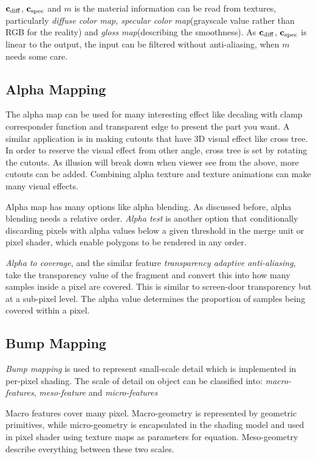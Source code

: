 \documentclass[10pt, a4paper]{article}
\begin{document}
$\textbf{c}_{\rm{diff}}$, $\textbf{c}_{\rm{spec}}$ and $m$ is the material information can be read from textures, particularly \emph{diffuse color map, specular color map}(grayscale value rather than RGB for the reality) and \emph{gloss map}(describing the smoothness). As $\textbf{c}_{\rm{diff}}$, $\textbf{c}_{\rm{spec}}$ is linear to the output, the input can be filtered without anti-aliasing, when $m$ needs some care. 
\subsection{Alpha Mapping}
The alpha map can be used for many interesting effect like decaling with clamp corresponder function and transparent edge to present the part you want. A similar application is in making cutouts that have 3D visual effect like cross tree. In order to reserve the visual effect from other angle, cross tree is set by rotating the cutouts. As illusion will break down when viewer see from the above, more cutouts can be added. Combining alpha texture and texture animations can make many visual effects. 

Alpha map has many options like alpha blending. As discussed before, alpha blending needs a relative order. \emph{Alpha test} is another option that conditionally discarding pixels with alpha values below a given threshold in the merge unit or pixel shader, which enable polygons to be rendered in any order. 

\emph{Alpha to coverage}, and the similar feature \emph{transparency adaptive anti-aliasing}, take the transparency value of the fragment and convert this into how many samples inside a pixel are covered. This is similar to screen-door transparency but at a sub-pixel level. The alpha value determines the proportion of samples being covered within a pixel. 

\subsection{Bump Mapping}
\emph{Bump mapping} is used to represent small-scale detail which is implemented in per-pixel shading. The scale of detail on object can be classified into: \emph{macro-features}, \emph{meso-feature} and \emph{micro-features}

Macro features cover many pixel. Macro-geometry is represented by geometric primitives, while micro-geometry is encapsulated in the shading model and used in pixel shader using texture maps as parameters for equation. Meso-geometry describe everything between these two scales.
\end{document}
